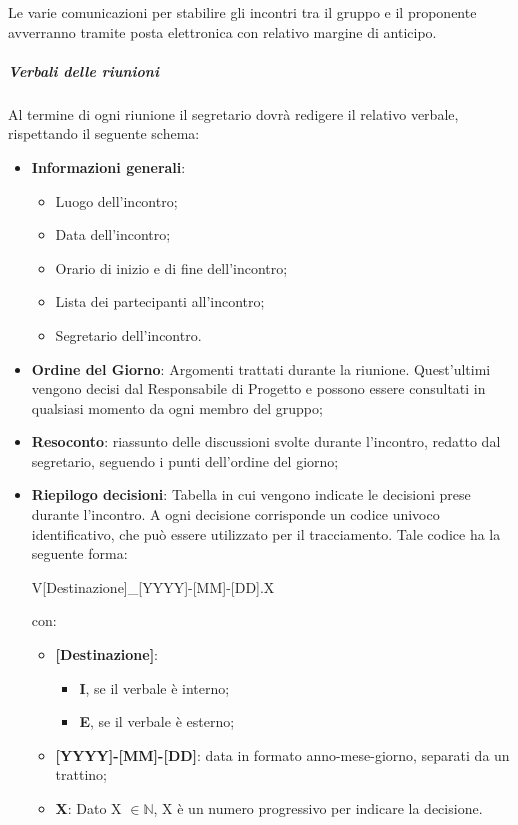 Le varie comunicazioni per stabilire gli incontri tra il gruppo e il proponente avverranno tramite posta elettronica con relativo margine di anticipo.
\subparagraph*{Verbali delle riunioni}
Al termine di ogni riunione il segretario dovrà redigere il relativo verbale, rispettando il seguente
schema:
\begin{itemize}
	\item \textbf{Informazioni generali}:
	\begin{itemize}
		\item Luogo dell'incontro;
		\item Data dell'incontro;
		\item Orario di inizio e di fine dell'incontro;
		\item Lista dei partecipanti all'incontro;
		\item Segretario dell'incontro.
	\end{itemize}
	\item \textbf{Ordine del Giorno}: Argomenti trattati durante la riunione. Quest’ultimi vengono decisi dal Responsabile di Progetto e possono essere consultati in qualsiasi momento da ogni membro del gruppo;
	\item \textbf{Resoconto}: riassunto delle discussioni svolte durante l'incontro, redatto dal segretario, seguendo i punti dell’ordine del giorno;
	\item \textbf{Riepilogo decisioni}: Tabella in cui vengono indicate le decisioni prese durante l'incontro.
	A ogni decisione corrisponde un codice univoco identificativo, che può essere utilizzato per il tracciamento.
	Tale codice ha la seguente forma:
	\begin{center}
		V[Destinazione]\_[YYYY]-[MM]-[DD].X	
	\end{center}
	con:
	\begin{itemize}
		\item \textbf{[Destinazione]}:
		\begin{itemize}
			\item \textbf{I}, se il verbale è interno;
			\item \textbf{E}, se il verbale è esterno;
		\end{itemize}
		\item \textbf{[YYYY]-[MM]-[DD]}: data in formato anno-mese-giorno, separati da un trattino;
		\item \textbf{X}: Dato X $\in \mathbb{N}$, X è un numero progressivo per indicare la decisione.
	\end{itemize}
\end{itemize}

